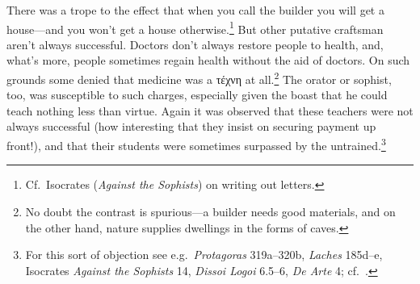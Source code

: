 \documentclass[11pt,letterpaper,oneside]{amsart} %
\begin{document}


There was a trope to the effect that when you call the builder you will get a house---and you won't get a house otherwise.\footnote{Cf.\ Isocrates (\emph{Against the Sophists}) on writing out letters.} But other putative craftsman aren't always successful. Doctors don't always restore people to health, and, what's more, people sometimes regain health without the aid of doctors. On such grounds some denied that medicine was a τέχνη at all.\footnote{No doubt the contrast is spurious---a builder needs good materials, and on the other hand, nature supplies dwellings in the forms of caves.} The orator or sophist, too, was susceptible to such charges, especially given the boast that he could teach nothing less than virtue. Again it was observed that these teachers were not always successful (how interesting that they insist on securing payment up front!), and that their students were sometimes surpassed by the untrained.\footnote{For this sort of objection see e.g.\ \emph{Protagoras} 319a--320b, \emph{Laches} 185d--e, Isocrates \emph{Against the Sophists} 14, \emph{Dissoi Logoi} 6.5--6, \emph{De Arte} 4; cf.~\citet[PP.\ 123--6]{heinimann1961vpt}.}
\end{document}
